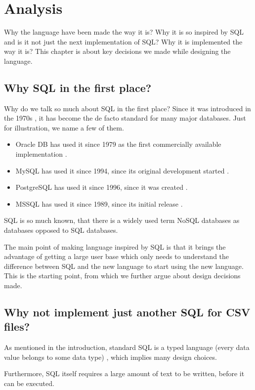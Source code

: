 \chapter{Analysis}
Why the language have been made the way it is? Why it is so inspired by SQL and is it not just the next implementation of SQL?
Why it is implemented the way it is?
This chapter is about key decisions we made while designing the language.


\section{Why SQL in the first place?}
Why do we talk so much about SQL in the first place? Since it was introduced in the 1970s \cite{enwiki-sql}, it has
become the de facto standard for many major databases. Just for illustration, we name a few of them.
\begin{itemize}
    \item Oracle DB has used it since 1979 as the first commercially available implementation \cite{oracle-db-sql}. 
    \item MySQL has used it since 1994, since its original development started \cite{enwiki-mysql}.
    \item PostgreSQL has used it since 1996, since it was created \cite{postgres-birthday}. 
    \item MSSQL has used it since 1989, since its initial release \cite{enwiki-mssql}. 
\end{itemize}

SQL is so much known, that there is a widely used term NoSQL databases as databases opposed to SQL databases.

The main point of making language inspired by SQL is that it brings the advantage of getting a large user base which only needs to understand the difference between SQL and the new language to start using the new language. This is the starting point, from which we further argue about design decisions made.


\section{Why not implement just another SQL for CSV files?}
As mentioned in the introduction, standard SQL is a typed language (every data value belongs to some data type) \cite{ISO9075-2023}, 
which implies many design choices. 

Furthermore, SQL itself requires a large amount of text to be written,
before it can be executed. 

